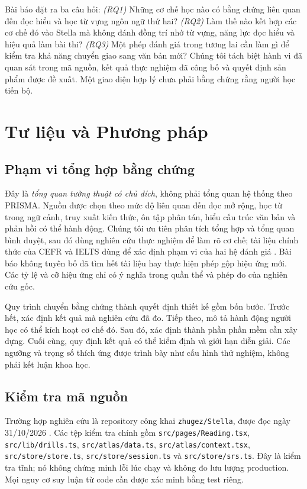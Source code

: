 \documentclass[conference,10pt]{IEEEtran}
\begin{document}
Bài báo đặt ra ba câu hỏi: \emph{(RQ1)} Những cơ chế học nào có bằng chứng liên quan đến đọc hiểu và học từ vựng ngôn ngữ thứ hai? \emph{(RQ2)} Làm thế nào kết hợp các cơ chế đó vào Stella mà không đánh đồng trí nhớ từ vựng, năng lực đọc hiểu và hiệu quả làm bài thi? \emph{(RQ3)} Một phép đánh giá trong tương lai cần làm gì để kiểm tra khả năng chuyển giao sang văn bản mới? Chúng tôi tách biệt hành vi đã quan sát trong mã nguồn, kết quả thực nghiệm đã công bố và quyết định sản phẩm được đề xuất. Một giao diện hợp lý chưa phải bằng chứng rằng người học tiến bộ.

\section{Tư liệu và Phương pháp}
\subsection{Phạm vi tổng hợp bằng chứng}
Đây là \emph{tổng quan tường thuật có chủ đích}, không phải tổng quan hệ thống theo PRISMA. Nguồn được chọn theo mức độ liên quan đến đọc mở rộng, học từ trong ngữ cảnh, truy xuất kiến thức, ôn tập phân tán, hiểu cấu trúc văn bản và phản hồi có thể hành động. Chúng tôi ưu tiên phân tích tổng hợp và tổng quan bình duyệt, sau đó dùng nghiên cứu thực nghiệm để làm rõ cơ chế; tài liệu chính thức của CEFR và IELTS dùng để xác định phạm vi của hai hệ đánh giá \cite{sangers2025,yanagisawa2020,roediger2006,coe2020,ieltsformat}. Bài báo không tuyên bố đã tìm hết tài liệu hay thực hiện phép gộp hiệu ứng mới. Các tỷ lệ và cỡ hiệu ứng chỉ có ý nghĩa trong quần thể và phép đo của nghiên cứu gốc.

Quy trình chuyển bằng chứng thành quyết định thiết kế gồm bốn bước. Trước hết, xác định kết quả mà nghiên cứu đã đo. Tiếp theo, mô tả hành động người học có thể kích hoạt cơ chế đó. Sau đó, xác định thành phần phần mềm cần xây dựng. Cuối cùng, quy định kết quả có thể kiểm định và giới hạn diễn giải. Các ngưỡng và trọng số thích ứng được trình bày như cấu hình thử nghiệm, không phải kết luận khoa học.

\subsection{Kiểm tra mã nguồn}
Trường hợp nghiên cứu là repository công khai \texttt{zhugez/Stella}, được đọc ngày 31/10/2026 \cite{stellarepo}. Các tệp kiểm tra chính gồm \texttt{src/pages/Reading.tsx}, \texttt{src/lib/drills.ts}, \texttt{src/atlas/data.ts}, \texttt{src/atlas/context.tsx}, \texttt{src/store/store.ts}, \texttt{src/store/session.ts} và \texttt{src/store/srs.ts}. Đây là kiểm tra tĩnh; nó không chứng minh lỗi lúc chạy và không đo lưu lượng production. Mọi nguy cơ suy luận từ code cần được xác minh bằng test riêng.
\end{document}
